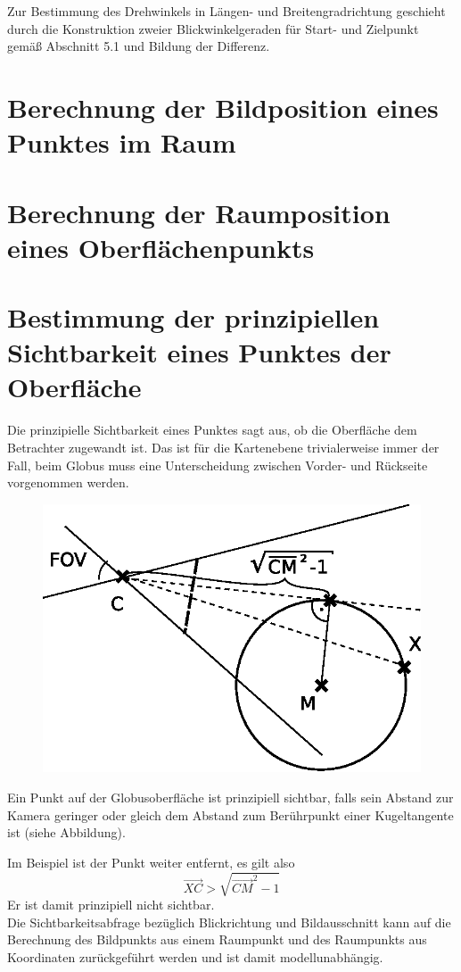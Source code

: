 \documentclass[10pt]{scrreprt}
\begin{document}
Zur Bestimmung des Drehwinkels in Längen- und Breitengradrichtung geschieht durch die Konstruktion zweier Blickwinkelgeraden für Start- und Zielpunkt gemäß Abschnitt 5.1 und Bildung der Differenz.

\section{Berechnung der Bildposition eines Punktes im Raum}

\section{Berechnung der Raumposition eines Oberflächenpunkts}

\section{Bestimmung der prinzipiellen Sichtbarkeit eines Punktes der Oberfläche}
Die prinzipielle Sichtbarkeit eines Punktes sagt aus, ob die Oberfläche dem Betrachter zugewandt ist. Das ist für die Kartenebene trivialerweise immer der Fall, beim Globus muss eine Unterscheidung zwischen Vorder- und Rückseite vorgenommen werden.\\
\begin{figure}
\flushright
\includegraphics[scale=0.75]{algo/SichtbarKugel.eps}
\end{figure}
Ein Punkt auf der Globusoberfläche ist prinzipiell sichtbar, falls sein Abstand zur Kamera geringer oder gleich dem Abstand zum Berührpunkt einer Kugeltangente ist (siehe Abbildung). 

Im Beispiel ist der Punkt weiter entfernt, es gilt also 
\[\vec{XC} > \sqrt{\vec{CM}^2-1}\]
Er ist damit prinzipiell nicht sichtbar.\\[5mm]
Die Sichtbarkeitsabfrage bezüglich Blickrichtung und Bildausschnitt kann auf die Berechnung des Bildpunkts aus einem Raumpunkt und des Raumpunkts aus Koordinaten zurückgeführt werden und ist damit modellunabhängig.
\end{document}
